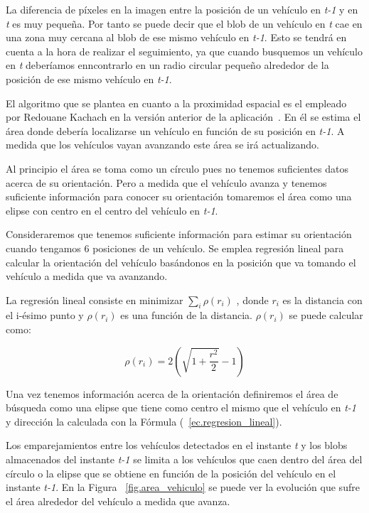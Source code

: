 La diferencia de píxeles en la imagen entre la posición de un vehículo en \textit{t-1} y en \textit{t} es muy pequeña. Por tanto se puede decir que el blob de un vehículo en \textit{t} cae en una zona muy cercana al blob de ese mismo vehículo en \textit{t-1}. Esto se tendrá en cuenta a la hora de realizar el seguimiento, ya que cuando busquemos un vehículo en \textit{t} deberíamos enncontrarlo en un radio circular pequeño alrededor de la posición de ese mismo vehículo en \textit{t-1}. 

El algoritmo que se plantea en cuanto a la proximidad espacial es el empleado por Redouane Kachach en la versión anterior de la aplicación~\cite{redo_tesis}. En él se estima el área donde debería localizarse un vehículo en función de su posición en \textit{t-1}. A medida que los vehículos vayan avanzando este área se irá actualizando.

Al principio el área se toma como un círculo pues no tenemos suficientes datos acerca de su orientación. Pero a medida que el vehículo avanza y tenemos suficiente información para conocer su orientación tomaremos el área como una elipse con centro en el centro del vehículo en \textit{t-1}. 

Consideraremos que tenemos suficiente información para estimar su orientación cuando tengamos 6 posiciones de un vehículo. Se emplea regresión lineal para calcular la orientación del vehículo basándonos en la posición que va tomando el vehículo a medida que va avanzando. 

La regresión lineal consiste en minimizar $\sum_{i}\rho(r_i)$ , donde $r_i$  es la  distancia  con  el  i-ésimo  punto  y $\rho(r_i)$ es una función de la distancia. $\rho(r_i)$ se puede calcular como:

\begin{equation}\label{ec.regresion_lineal}
   \rho(r_i) = 2(\sqrt{1 +\frac{r^2}{2}} - 1) 
\end{equation}

Una vez tenemos información acerca de la orientación definiremos el área de búsqueda como una elipse que tiene como centro el mismo que el vehículo en \textit{t-1} y dirección la calculada con la Fórmula (~\ref{ec.regresion_lineal}).

Los emparejamientos entre los vehículos detectados en el instante \textit{t} y los blobs almacenados del instante \textit{t-1} se limita a los vehículos que caen dentro del área del círculo o la elipse que se obtiene en función de la posición del vehículo en el instante \textit{t-1}. En la Figura ~\ref{fig.area_vehiculo} se puede ver la evolución que sufre el área alrededor del vehículo a medida que avanza.

